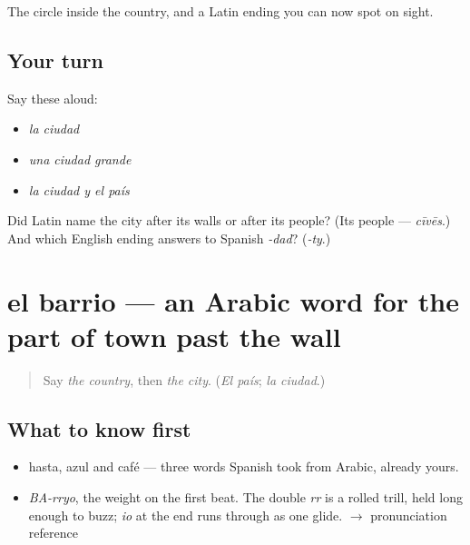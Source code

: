 \begin{grammarlens}[title={What you've built}]
The circle inside the country, and a Latin ending you can now spot on sight.
\end{grammarlens}

\subsection*{Your turn}
Say these aloud:

\begin{itemize}
\raggedright
  \item \emph{la ciudad}
  \item \emph{una ciudad grande}
  \item \emph{la ciudad y el país}
\end{itemize}

\begin{tcolorbox}[breakable,colback=teal!4,colframe=teal!35!black,title={Before you move on}]
Did Latin name the city after its walls or after its people? (Its people — \emph{cīvēs}.) And which English ending answers to Spanish \emph{-dad}? (\emph{-ty}.)
\end{tcolorbox}
\section[el barrio]{el barrio — an Arabic word for the part of town past the wall}

\label{lesson:ES-C325-barrio}



\begin{quote}
Say \emph{the country}, then \emph{the city}. (\emph{El país}; \emph{la ciudad}.)
\end{quote}

\subsection*{What to know first}
\begin{itemize}
\raggedright
  \item hasta, azul and café — three words Spanish took from Arabic, already yours.
\end{itemize}

\begin{sounds}
\begin{itemize}
\raggedright
  \item \emph{BA-rryo}, the weight on the first beat. The double \emph{rr} is a rolled trill, held long enough to buzz; \emph{io} at the end runs through as one glide. $\to$ pronunciation reference
\end{itemize}
\end{sounds}

